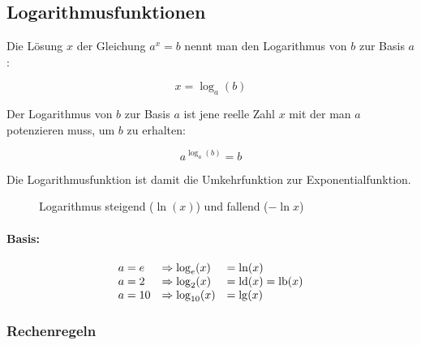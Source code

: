 \subsection{Logarithmusfunktionen}

Die Lösung \( x \) der Gleichung \( a^x = b \) nennt man
den Logarithmus von \( b \) zur Basis \( a \):

\[
    x = \log_a(b)
\]

Der Logarithmus von \( b \) zur Basis \( a \) ist jene reelle
Zahl \( x \) mit der man \( a \) potenzieren muss, um \( b \)
zu erhalten:

\[
    a^{\log_a(b)} = b    
\]

Die Logarithmusfunktion ist damit die Umkehrfunktion zur
Exponentialfunktion.


\begin{figure}[H]
    \centering
    \caption{Logarithmus steigend (\( \ln(x) \)) und fallend (\( -\ln{x} \))}
\end{figure}


\paragraph{Basis:}
\begin{equation*}
    \begin{array}{lll}
        a = e &\Rightarrow \log_e(x) &= \ln(x) \\
        a = 2 &\Rightarrow \log_2(x) &= \operatorname{ld}(x) = \operatorname{lb}(x) \\
        a = 10 &\Rightarrow \log_{10}(x) &= \lg(x)
    \end{array}
\end{equation*}

\subsubsection{Rechenregeln}

